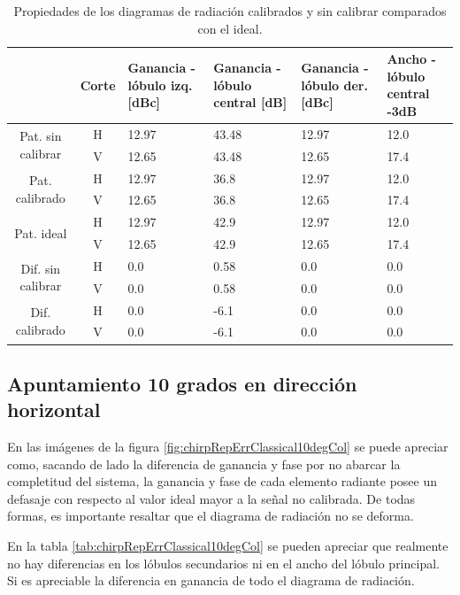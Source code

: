 \begin{table}[H]
  \footnotesize
  \centering
  \begin{tabular}{|c|c|p{2cm}|p{2.5cm}|p{2.5cm}|p{2.5cm}|}
    \cline{2-6}
    \multicolumn{1}{c|}{} & Corte & Ganancia - lóbulo izq. [dBc] & Ganancia - lóbulo central [dB] &
    Ganancia - lóbulo der. [dBc] & Ancho - lóbulo central -3dB \tabularnewline\hline
    \multirow{2}{2cm}{Pat. sin calibrar} & H & 12.97 & 43.48 & 12.97 & 12.0 \tabularnewline\cline{2-6}
     & V & 12.65 & 43.48 & 12.65 & 17.4 \tabularnewline\hline
    \multirow{2}{2cm}{Pat. calibrado} & H & 12.97 & 36.8 & 12.97 & 12.0 \tabularnewline\cline{2-6}
     & V & 12.65 & 36.8 & 12.65 & 17.4 \tabularnewline\hline
    \multirow{2}{2cm}{Pat. ideal} & H & 12.97 & 42.9 & 12.97 & 12.0 \tabularnewline\cline{2-6}
     & V & 12.65 & 42.9 & 12.65 & 17.4 \tabularnewline\hline
    \multirow{2}{2cm}{Dif. sin calibrar} & H & 0.0 & 0.58 & 0.0 & 0.0\tabularnewline\cline{2-6}
     & V & 0.0 & 0.58 & 0.0 & 0.0 \tabularnewline\hline
    \multirow{2}{2cm}{Dif. calibrado} & H & 0.0 & -6.1 & 0.0 & 0.0 \tabularnewline\cline{2-6}
     & V & 0.0 & -6.1 & 0.0 & 0.0 \tabularnewline\hline
  \end{tabular}
  \caption{Propiedades de los diagramas de radiación calibrados y sin calibrar comparados con el ideal.}
  \label{tab:chirpRepErrClassical0deg}
\end{table}


\subsection{Apuntamiento 10 grados en dirección horizontal}

En las imágenes de la figura \ref{fig:chirpRepErrClassical10degCol} se puede apreciar como, sacando de lado la diferencia de 
ganancia y fase por no abarcar la completitud del sistema, la ganancia y fase de cada elemento radiante posee un defasaje con 
respecto al valor ideal mayor a la señal no calibrada. De todas formas, es importante resaltar que el diagrama de radiación no 
se deforma. 

En la tabla \ref{tab:chirpRepErrClassical10degCol} se pueden apreciar que realmente no hay diferencias en los lóbulos secundarios 
ni en el ancho del lóbulo principal. Si es apreciable la diferencia en ganancia de todo el diagrama de radiación.

